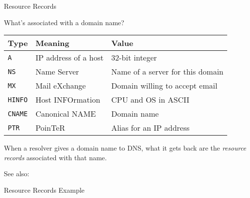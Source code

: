 \begin{frame}{Resource Records}
  \begin{iblock}{What's associated with a domain name?}
    \begin{small}
    \begin{tabular}{@{}llp{}@{}}\toprule
      \textbf{Type}&\textbf{Meaning}&\textbf{Value}\\\midrule
      \texttt{A}&IP address of a host&32-bit integer\\[1ex]
      \texttt{NS}&Name Server&Name of a server for this domain\\[1ex]
      \texttt{MX}&Mail eXchange&Domain willing to accept email\\[1ex]
      \texttt{HINFO}&Host INFOrmation&CPU and OS in ASCII\\[1ex]
      \texttt{CNAME}&Canonical NAME&Domain name\\[1ex]
      \texttt{PTR}&PoinTeR&Alias for an IP address\\\bottomrule
    \end{tabular}
    \end{small}
  \end{iblock}
  When a resolver gives a domain name to DNS, what it gets back are the \emph{resource records}
  associated with that name.
\end{frame}

See also: 

\begin{frame}{Resource Records Example}
  \centering
  \mode<beamer>{ \texttt{[image: dns-rr2]} }%
\end{frame}

